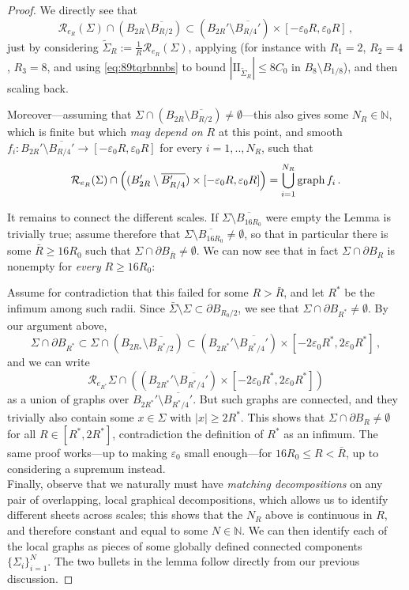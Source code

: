 \documentclass{article}
\newcommand{\N}{\mathbb{N}}
\newcommand{\ep}{\varepsilon}
\theoremstyle{definition}
\begin{document}
\begin{proof}
    We directly see that
    $$\mathcal R_{e_R}(\Sigma) \cap (B_{2R}\setminus \overline{B_{R/2}})\subset (B_{2R}'\setminus \overline{B_{R/4}'})\times [-\ep_0R,\ep_0R]\,,$$
    just by considering $\widetilde \Sigma_R:=\frac{1}{R}\mathcal R_{e_R}(\Sigma)$, applying  (for instance with $R_1=2$, $R_2=4$, $R_3=8$, and using \eqref{eq:89tqrbnnbs} to bound $|\mathrm{II}_{\widetilde \Sigma_R}|\leq 8C_0$ in $B_8\setminus B_{1/8}$), and then scaling back.

    Moreover---assuming that $\Sigma \cap (B_{2R}\setminus \overline{B_{R/2}})\neq \emptyset$---this also gives some $N_R\in\N$, which is finite but which \textit{may depend on $R$} at this point, and smooth $f_i:B_{2R}'\setminus \overline{B_{R/4}'}\to [-\ep_0 R,\ep_0R]$ for every $i=1,..,N_R$, such that
    $$\mathcal R_{e_R}(\Sigma) \cap \left((B_{2R}'\setminus \overline{B_{R/4}'})\times[-\ep_0R,\ep_0R]\right)=\bigcup_{i=1}^{N_R} {\rm graph}\, f_i\,.$$

    
    It remains to connect the different scales. If $\Sigma\setminus \overline{B_{16R_0}}$ were empty the Lemma is trivially true; assume therefore that $\Sigma\setminus \overline{B_{16R_0}}\neq\emptyset$, so that in particular there is some $\bar R\geq 16 R_0$ such that $\Sigma\cap \partial B_{\bar R}\neq \emptyset$. We can now see that in fact $\Sigma\cap \partial B_R$ is nonempty for \textit{every} $R\geq 16R_0$:
    
    Assume for contradiction that this failed for some $R>\bar R$, and let $R^*$ be the infimum among such radii. Since $\bar \Sigma\setminus\Sigma\subset \partial B_{R_0/2}$, we see that $\Sigma\cap \partial B_{R^*}\neq\emptyset$. By our argument above,
    $$\Sigma\cap \partial B_{R^*}\subset \Sigma\cap(B_{2R_*}\setminus \overline{B_{R^*/2}})\subset (B_{2R^*}'\setminus \overline{B_{R^*/4}'})\times[-2\ep_0R^*,2\ep_0R^*]\,,$$
    and we can write
    $$\mathcal R_{e_{R^*}}\Sigma\cap \left((B_{2R^*}'\setminus \overline{B_{R^*/4}'})\times[-2\ep_0R^*,2\ep_0R^*]\right)$$ as a union of graphs over $B_{2R^*}'\setminus \overline{B_{R^*/4}'}$. But such graphs are connected, and they trivially also contain some $x\in \Sigma$ with $|x|\geq 2R^*$. This shows that $\Sigma\cap \partial B_R\neq\emptyset$ for all $R\in[R^*,2R^*]$, contradiction the definition of $R^*$ as an infimum. The same proof works---up to making $\ep_0$ small enough---for $16 R_0\leq R<\bar R$, up to considering a supremum instead.\\

    Finally, observe that we naturally must have \textit{matching decompositions} on any pair of overlapping, local graphical decompositions, which allows us to identify different sheets across scales; this shows that the $N_R$ above is continuous in $R$, and therefore constant and equal to some $N\in\N$. We can then identify each of the local graphs as pieces of some globally defined connected components $\{\Sigma_i\}_{i=1}^N$. The two bullets in the lemma follow directly from our previous discussion.
\end{proof}
\end{document}
